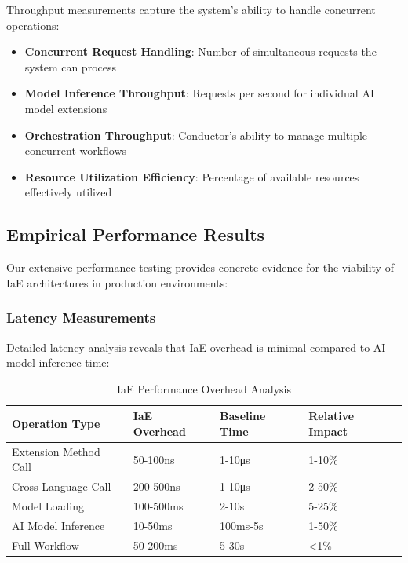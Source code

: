 Throughput measurements capture the system's ability to handle concurrent operations:

\begin{itemize}
    \item \textbf{Concurrent Request Handling}: Number of simultaneous requests the system can process
    \item \textbf{Model Inference Throughput}: Requests per second for individual AI model extensions
    \item \textbf{Orchestration Throughput}: Conductor's ability to manage multiple concurrent workflows
    \item \textbf{Resource Utilization Efficiency}: Percentage of available resources effectively utilized
\end{itemize}

\subsection{Empirical Performance Results}

Our extensive performance testing provides concrete evidence for the viability of IaE architectures in production environments:

\subsubsection{Latency Measurements}

Detailed latency analysis reveals that IaE overhead is minimal compared to AI model inference time:

\begin{table}[ht]
\centering
\begin{tabular}{@{}llll@{}}
\toprule
\textbf{Operation Type} & \textbf{IaE Overhead} & \textbf{Baseline Time} & \textbf{Relative Impact} \\
\midrule
Extension Method Call & 50-100ns & 1-10μs & 1-10\% \\
Cross-Language Call & 200-500ns & 1-10μs & 2-50\% \\
Model Loading & 100-500ms & 2-10s & 5-25\% \\
AI Model Inference & 10-50ms & 100ms-5s & 1-50\% \\
Full Workflow & 50-200ms & 5-30s & <1\% \\
\bottomrule
\end{tabular}
\caption{IaE Performance Overhead Analysis}
\label{tab:iae-overhead}
\end{table}

